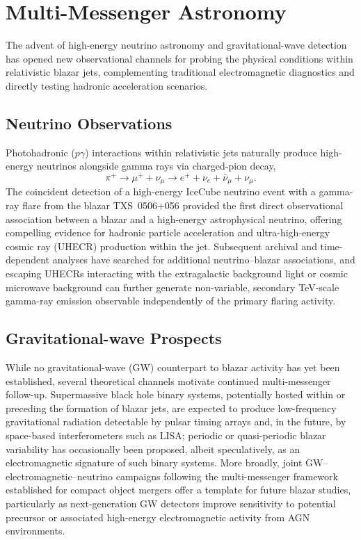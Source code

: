 \documentclass[11pt]{article}
\begin{document}
\section{Multi-Messenger Astronomy}

The advent of high-energy neutrino astronomy and gravitational-wave detection has opened new observational channels for probing the physical conditions within relativistic blazar jets, complementing traditional electromagnetic diagnostics and directly testing hadronic acceleration scenarios.

\subsection{Neutrino Observations}

Photohadronic ($p\gamma$) interactions within relativistic jets naturally produce high-energy neutrinos alongside gamma rays via charged-pion decay,
\begin{equation}
\pi^{+} \rightarrow \mu^{+} + \nu_\mu \rightarrow e^{+} + \nu_e + \bar{\nu}_\mu + \nu_\mu.
\end{equation}
The coincident detection of a high-energy IceCube neutrino event with a gamma-ray flare from the blazar TXS~0506+056 provided the first direct observational association between a blazar and a high-energy astrophysical neutrino, offering compelling evidence for hadronic particle acceleration and ultra-high-energy cosmic ray (UHECR) production within the jet. Subsequent archival and time-dependent analyses have searched for additional neutrino--blazar associations, and escaping UHECRs interacting with the extragalactic background light or cosmic microwave background can further generate non-variable, secondary TeV-scale gamma-ray emission observable independently of the primary flaring activity.

\subsection{Gravitational-wave Prospects}

While no gravitational-wave (GW) counterpart to blazar activity has yet been established, several theoretical channels motivate continued multi-messenger follow-up. Supermassive black hole binary systems, potentially hosted within or preceding the formation of blazar jets, are expected to produce low-frequency gravitational radiation detectable by pulsar timing arrays and, in the future, by space-based interferometers such as LISA; periodic or quasi-periodic blazar variability has occasionally been proposed, albeit speculatively, as an electromagnetic signature of such binary systems. More broadly, joint GW--electromagnetic--neutrino campaigns following the multi-messenger framework established for compact object mergers offer a template for future blazar studies, particularly as next-generation GW detectors improve sensitivity to potential precursor or associated high-energy electromagnetic activity from AGN environments.
\end{document}
